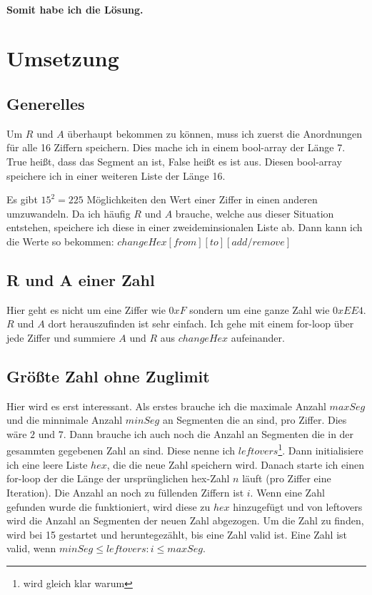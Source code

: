 \documentclass[a4paper,10pt,ngerman]{scrartcl}
\begin{document}
\paragraph{Somit habe ich die Lösung.}

\section{Umsetzung}

\subsection{Generelles}

Um $R$ und $A$ überhaupt bekommen zu können, muss ich zuerst die Anordnungen für alle 16 Ziffern speichern. Dies mache ich in einem bool-array der Länge 7. True heißt, dass das Segment an ist, False heißt es ist aus. Diesen bool-array speichere ich in einer weiteren Liste der Länge 16.

Es gibt $15^2 = 225$ Möglichkeiten den Wert einer Ziffer in einen anderen umzuwandeln. Da ich häufig $R$ und $A$ brauche, welche aus dieser Situation entstehen, speichere ich diese in einer zweideminsionalen Liste ab. Dann kann ich die Werte so bekommen: $changeHex[from][to][add/remove]$

\subsection{R und A einer Zahl}

Hier geht es nicht um eine Ziffer wie $0xF$ sondern um eine ganze Zahl wie $0xEE4$. $R$ und $A$ dort herauszufinden ist sehr einfach. Ich gehe mit einem for-loop über jede Ziffer und summiere $A$ und $R$ aus $changeHex$ aufeinander.

\subsection{Größte Zahl ohne Zuglimit}

Hier wird es erst interessant. Als erstes brauche ich die maximale Anzahl $maxSeg$ und die minnimale Anzahl $minSeg$ an Segmenten die an sind, pro Ziffer. Dies wäre $2$ und $7$. Dann brauche ich auch noch die Anzahl an Segmenten die in der gesammten gegebenen Zahl an sind. Diese nenne ich $leftovers$\footnote{wird gleich klar warum}. Dann initialisiere ich eine leere Liste $hex$, die die neue Zahl speichern wird. Danach starte ich einen for-loop der die Länge der ursprünglichen hex-Zahl $n$ läuft (pro Ziffer eine Iteration). Die Anzahl an noch zu füllenden Ziffern ist $i$. Wenn eine Zahl gefunden wurde die funktioniert, wird diese zu $hex$ hinzugefügt und von leftovers wird die Anzahl an Segmenten der neuen Zahl abgezogen. Um die Zahl zu finden, wird bei 15 gestartet und heruntegezählt, bis eine Zahl valid ist. Eine Zahl ist valid, wenn $minSeg \leq leftovers : i \leq maxSeg$.
\end{document}
